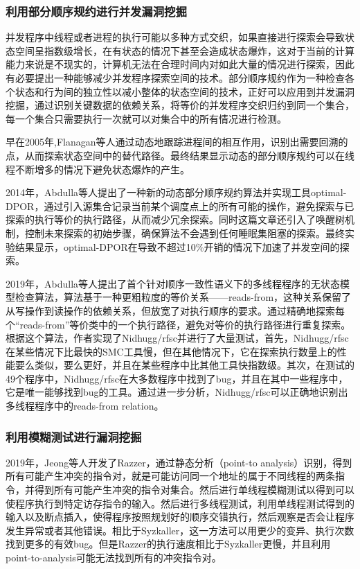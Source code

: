 \subsubsection{利用部分顺序规约进行并发漏洞挖掘}

并发程序中线程或者进程的执行可能以多种方式交织，如果直接进行探索会导致状态空间呈指数级增长，在有状态的情况下甚至会造成状态爆炸，这对于当前的计算能力来说是不现实的，计算机无法在合理时间内对如此大量的情况进行探索，因此有必要提出一种能够减少并发程序探索空间的技术。部分顺序规约作为一种检查各个状态和行为间的独立性以减小整体的状态空间的技术，正好可以应用到并发漏洞挖掘，通过识别关键数据的依赖关系，将等价的并发程序交织归约到同一个集合，每一个集合只需要执行一次就可以对集合中的所有情况进行检测。

早在2005年,Flanagan\cite{flanagan2005dynamic}等人通过动态地跟踪进程间的相互作用，识别出需要回溯的点，从而探索状态空间中的替代路径。最终结果显示动态的部分顺序规约可以在线程不断增多的情况下避免状态爆炸的产生。

2014年，Abdulla\cite{abdulla2014optimal}等人提出了一种新的动态部分顺序规约算法并实现工具optimal-DPOR，通过引入源集合记录当前某个调度点上的所有可能的操作，避免探索与已探索的执行等价的执行路径，从而减少冗余探索。同时这篇文章还引入了唤醒树机制，控制未来探索的初始步骤，确保算法不会遇到任何睡眠集阻塞的探索。最终实验结果显示，optimal-DPOR在导致不超过10\%开销的情况下加速了并发空间的探索。

2019年，Abdulla\cite{abdulla2019optimal}等人提出了首个针对顺序一致性语义下的多线程程序的无状态模型检查算法，算法基于一种更粗粒度的等价关系——reads-from，这种关系保留了从写操作到读操作的依赖关系，但放宽了对执行顺序的要求。通过精确地探索每个“reads-from”等价类中的一个执行路径，避免对等价的执行路径进行重复探索。根据这个算法，作者实现了Nidhugg/rfsc并进行了大量测试，首先，Nidhugg/rfsc在某些情况下比最快的SMC工具慢，但在其他情况下，它在探索执行数量上的性能要么类似，要么更好，并且在某些程序中比其他工具快指数级。其次，在测试的49个程序中，Nidhugg/rfsc在大多数程序中找到了bug，并且在其中一些程序中，它是唯一能够找到bug的工具。通过进一步分析，Nidhugg/rfsc可以正确地识别出多线程程序中的reads-from relation。

\subsubsection{利用模糊测试进行漏洞挖掘}

2019年，Jeong\cite{jeong2019razzer}等人开发了Razzer，通过静态分析（point-to analysis）识别，得到所有可能产生冲突的指令对，就是可能访问同一个地址的属于不同线程的两条指令，并得到所有可能产生冲突的指令对集合。然后进行单线程模糊测试以得到可以使程序执行到特定访存指令的输入。然后进行多线程测试，利用单线程测试得到的输入以及断点插入，使得程序按照规划好的顺序交错执行，然后观察是否会让程序发生异常或者其他错误。相比于Syzkaller，这一方法可以用更少的变异、执行次数找到更多的有效bug。但是Razzer的执行速度相比于Syzkaller更慢，并且利用point-to-analysis可能无法找到所有的冲突指令对。

